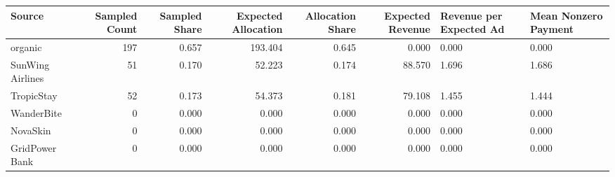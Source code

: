 \begin{tabular}{lrrrrr}
\hline
Source & Sampled Count & Sampled Share & Expected Allocation & Allocation Share & Expected Revenue & Revenue per Expected Ad & Mean Nonzero Payment \\
\hline
organic & 197 & 0.657 & 193.404 & 0.645 & 0.000 & 0.000 & 0.000 \\
SunWing Airlines & 51 & 0.170 & 52.223 & 0.174 & 88.570 & 1.696 & 1.686 \\
TropicStay & 52 & 0.173 & 54.373 & 0.181 & 79.108 & 1.455 & 1.444 \\
WanderBite & 0 & 0.000 & 0.000 & 0.000 & 0.000 & 0.000 & 0.000 \\
NovaSkin & 0 & 0.000 & 0.000 & 0.000 & 0.000 & 0.000 & 0.000 \\
GridPower Bank & 0 & 0.000 & 0.000 & 0.000 & 0.000 & 0.000 & 0.000 \\
\hline
\end{tabular}
